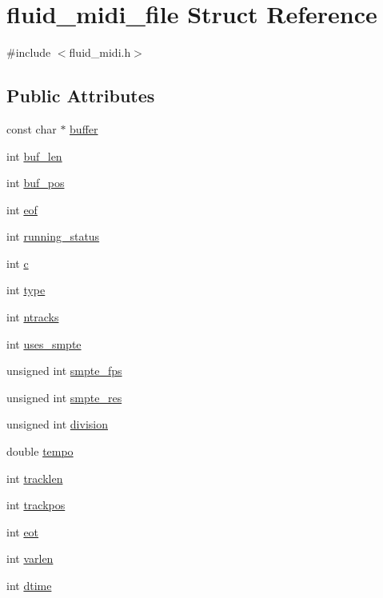 \hypertarget{structfluid__midi__file}{}\section{fluid\+\_\+midi\+\_\+file Struct Reference}
\label{structfluid__midi__file}


{\ttfamily \#include $<$fluid\+\_\+midi.\+h$>$}

\subsection*{Public Attributes}
\begin{DoxyCompactItemize}
\item 
const char $\ast$ \hyperlink{structfluid__midi__file_ace0de37712aa7e3fbe3a4c48f1ce1fb8}{buffer}
\item 
int \hyperlink{structfluid__midi__file_ace00cd375369740e09210d7a3fad54a2}{buf\+\_\+len}
\item 
int \hyperlink{structfluid__midi__file_aa2ccfed53231bc7021b3baf0e9b31364}{buf\+\_\+pos}
\item 
int \hyperlink{structfluid__midi__file_a050039d78fb43d7ee7efa040645586fd}{eof}
\item 
int \hyperlink{structfluid__midi__file_a88f56d89f22e11771bc6d620d892baea}{running\+\_\+status}
\item 
int \hyperlink{structfluid__midi__file_ae951edb4cde6ddcdd4e5c154fad1a752}{c}
\item 
int \hyperlink{structfluid__midi__file_a7fcfac4a208e7f3e3c37a98472d4c4d4}{type}
\item 
int \hyperlink{structfluid__midi__file_aca3b77e26b8c00ede41f1203eeddabe9}{ntracks}
\item 
int \hyperlink{structfluid__midi__file_a979fd3094ba04aabd4fe35cbb82bc96a}{uses\+\_\+smpte}
\item 
unsigned int \hyperlink{structfluid__midi__file_a4e8e9d889bf05ce2f179adc5e7378cb7}{smpte\+\_\+fps}
\item 
unsigned int \hyperlink{structfluid__midi__file_a3faf5e416472ce7476ffe146d1f46db9}{smpte\+\_\+res}
\item 
unsigned int \hyperlink{structfluid__midi__file_a339f67558ad7e54e910a59d8e23df1f1}{division}
\item 
double \hyperlink{structfluid__midi__file_abc8ae56d8cff3ea5287d801d0373098e}{tempo}
\item 
int \hyperlink{structfluid__midi__file_a01e49fa99a12c14ec0b1b296c30bf055}{tracklen}
\item 
int \hyperlink{structfluid__midi__file_a177e3e5d5ac95d23498ff209c6745dae}{trackpos}
\item 
int \hyperlink{structfluid__midi__file_a2c5180fd4d099084db24a2d6d590f35f}{eot}
\item 
int \hyperlink{structfluid__midi__file_a67123221394c6191e4b9b8313449efab}{varlen}
\item 
int \hyperlink{structfluid__midi__file_a984c2296a4b8372d309e1cac18d789d7}{dtime}
\end{DoxyCompactItemize}


